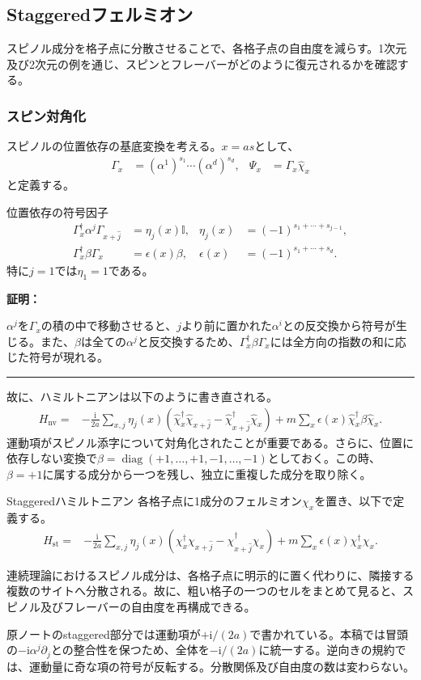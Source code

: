 \documentclass[a4paper,10.5pt]{article}
\numberwithin{equation}{section}
\providecommand{\ii}{\mathrm{i}}
\providecommand{\id}{\mathbb{I}}
\providecommand{\nv}{\mathrm{nv}}
\providecommand{\st}{\mathrm{st}}
\newenvironment{proofbox}
{\begin{prooflabel}\textbf{証明：}\end{prooflabel}\vspace{0.8em}}
{\par\vspace{1em}\hrule\vspace{1em}}
\begin{document}
\subsection{Staggeredフェルミオン}
スピノル成分を格子点に分散させることで、各格子点の自由度を減らす。1次元及び2次元の例を通じ、スピンとフレーバーがどのように復元されるかを確認する。


\subsubsection{スピン対角化}
スピノルの位置依存の基底変換を考える。$x=as$として、
\begin{align}
\Gamma_x&=(\alpha^1)^{s_1}\cdots(\alpha^d)^{s_d},&
\Psi_x&=\Gamma_x\widehat\chi_x
\end{align}
と定義する。
\begin{resultbox}{位置依存の符号因子}
\begin{align}
\Gamma_x^\dagger\alpha^j\Gamma_{x+\hat j}
 &=\eta_j(x)\id,&
\eta_j(x)&=(-1)^{s_1+\cdots+s_{j-1}},\\
\Gamma_x^\dagger\beta\Gamma_x&=\epsilon(x)\beta,&
\epsilon(x)&=(-1)^{s_1+\cdots+s_d}.
\end{align}
特に$j=1$では$\eta_1=1$である。
\end{resultbox}
\begin{proofbox}
$\alpha^j$を$\Gamma_x$の積の中で移動させると、$j$より前に置かれた$\alpha^i$との反交換から符号が生じる。また、$\beta$は全ての$\alpha^j$と反交換するため、$\Gamma_x^\dagger\beta\Gamma_x$には全方向の指数の和に応じた符号が現れる。
\end{proofbox}
故に、ハミルトニアンは以下のように書き直される。
\begin{align}
H_{\nv}
={}&-\frac{\ii}{2a}\sum_{x,j}\eta_j(x)
\left(\widehat\chi_x^\dagger\widehat\chi_{x+\hat j}
-\widehat\chi_{x+\hat j}^\dagger\widehat\chi_x\right)
+m\sum_x\epsilon(x)\widehat\chi_x^\dagger\beta\widehat\chi_x.
\end{align}
運動項がスピノル添字について対角化されたことが重要である。さらに、位置に依存しない変換で$\beta=\operatorname{diag}(+1,\ldots,+1,-1,\ldots,-1)$としておく。この時、$\beta=+1$に属する成分から一つを残し、独立に重複した成分を取り除く。
\begin{defbox}{Staggeredハミルトニアン}
各格子点に1成分のフェルミオン$\chi_x$を置き、以下で定義する。
\begin{align}
H_{\st}
={}&-\frac{\ii}{2a}\sum_{x,j}\eta_j(x)
\left(\chi_x^\dagger\chi_{x+\hat j}
-\chi_{x+\hat j}^\dagger\chi_x\right)
+m\sum_x\epsilon(x)\chi_x^\dagger\chi_x.
\label{eq:stag}
\end{align}
\end{defbox}
連続理論におけるスピノル成分は、各格子点に明示的に置く代わりに、隣接する複数のサイトへ分散される。故に、粗い格子の一つのセルをまとめて見ると、スピノル及びフレーバーの自由度を再構成できる。
\begin{remarkbox}
原ノートのstaggered部分では運動項が$+\ii/(2a)$で書かれている。本稿では冒頭の$-\ii\alpha^j\partial_j$との整合性を保つため、全体を$-\ii/(2a)$に統一する。逆向きの規約では、運動量に奇な項の符号が反転する。分散関係及び自由度の数は変わらない。
\end{remarkbox}
\end{document}
